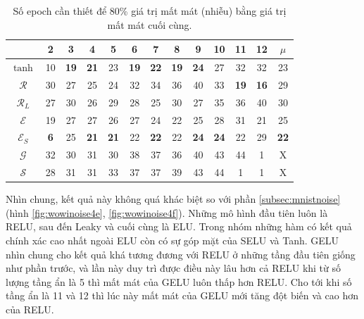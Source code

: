 \begin{table}[ht!]
\centering
\def\arraystretch{1.3}
\begin{tabular}{c|c|c|c|c|c|c|c|c|c|c|c|c|}
\cline{2-13}
                        & 2  & 3  & 4  & 5  & 6  & 7  & 8  & 9  & 10 & 11 & 12 & $\mu$ \\ \hline
\multicolumn{1}{|c|}{$\tanh$} & 10 & \textbf{19} & \textbf{21} & 23 & \textbf{19} & \textbf{22} & \textbf{19} & \textbf{24} & 27 & 32 & 32 & 23\\ \hline
\multicolumn{1}{|c|}{$\mathcal{R}$} & 30 & 27 & 25 & 24 & 32 & 34 & 36 & 40 & 33 & \textbf{19} & \textbf{16} & 29\\ \hline
\multicolumn{1}{|c|}{$\mathcal{R}_L$} & 27 & 30 & 26 & 29 & 28 & 25 & 30 & 27 & 35 & 36 & 40 & 30\\ \hline
\multicolumn{1}{|c|}{$\mathcal{E}$} & 19 & 27 & 27 & 26 & 27 & 24 & 22 & 25 & 28 & 31 & 21 & 25\\ \hline
\multicolumn{1}{|c|}{$\mathcal{E}_S$} & \textbf{6}  & 25 & \textbf{21} & \textbf{21} & 22 & \textbf{22} & 22 & \textbf{24} & \textbf{24} & 22 & 29 & \textbf{22}\\ \hline
\multicolumn{1}{|c|}{$\mathcal{G}$} & 32 & 30 & 31 & 30 & 38 & 37 & 36 & 40 & 43 & 44 & 1  & X\\ \hline
\multicolumn{1}{|c|}{$\mathcal{S}$} & 28 & 31 & 31 & 33 & 37 & 37 & 39 & 43 & 44 & 1  & 1  & X\\ \hline
\end{tabular}
\caption{Số epoch cần thiết để 80\% giá trị mất mát (nhiễu) bằng giá trị mất mát cuối cùng.}
\label{tab:wowinoiseepoch}
\end{table}

Nhìn chung, kết quả này không quá khác biệt so với phần \ref{subsec:mnistnoise} (hình \ref{fig:wowinoise4e}, \ref{fig:wowinoise4f}).
Những mô hình đầu tiên luôn là RELU, sau đến Leaky và cuối cùng là ELU.
Trong nhóm những hàm có kết quả chính xác cao nhất ngoài ELU còn có sự góp mặt của SELU và Tanh.
GELU nhìn chung cho kết quả khá tương đương với RELU ở những tầng đầu tiên giống như phần trước, và lần này duy trì được điều này lâu hơn cả RELU khi từ số lượng tầng ẩn là 5 thì mất mát của GELU luôn thấp hơn RELU.
Cho tới khi số tầng ẩn là 11 và 12 thì lúc này mất mát của GELU mới tăng đột biến và cao hơn của RELU.

